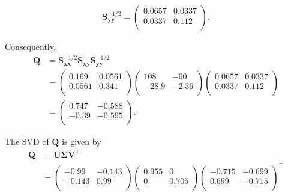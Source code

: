 \documentclass[
]{book}
\theoremstyle{definition}
\theoremstyle{definition}
\theoremstyle{definition}
\theoremstyle{definition}
\theoremstyle{remark}
\begin{document}
\begin{align*}
\mathbf S_{\mathbf y\mathbf y}^{-1/2}= \begin{pmatrix}0.0657&0.0337 \\0.0337&0.112 \\\end{pmatrix}.
\end{align*}

Consequently,
\begin{align*}
\mathbf Q&=\mathbf S_{\mathbf x\mathbf x}^{-1/2}\mathbf S_{\mathbf x\mathbf y}\mathbf S_{\mathbf y\mathbf y}^{-1/2}\\
&=\begin{pmatrix}0.169&0.0561 \\0.0561&0.341 \\\end{pmatrix} \begin{pmatrix}108&-60 \\-28.9&-2.36 \\\end{pmatrix}\begin{pmatrix}0.0657&0.0337 \\0.0337&0.112 \\\end{pmatrix}\\
&=\begin{pmatrix}0.747&-0.588 \\-0.39&-0.595 \\\end{pmatrix}.
\end{align*}

The SVD of \(\mathbf Q\) is given by
\begin{align}
\mathbf Q&=\mathbf U{\pmb \Sigma} \mathbf V^\top \nonumber \\
&=\begin{pmatrix}-0.99&-0.143 \\-0.143&0.99 \\\end{pmatrix} \begin{pmatrix}0.955&0 \\0&0.705 \\\end{pmatrix}\begin{pmatrix}-0.715&-0.699 \\0.699&-0.715 \\\end{pmatrix}^\top
\label{eq:SVDanalysis}
\end{align}
\end{document}
